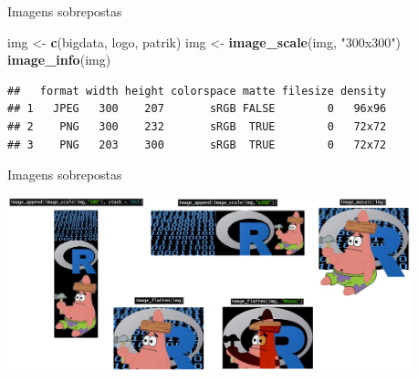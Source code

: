 \documentclass[
  ignorenonframetext,
]{beamer}
\newenvironment{Shaded}{\begin{snugshade}}{\end{snugshade}}
\newcommand{\KeywordTok}[1]{\textcolor[rgb]{0.13,0.29,0.53}{\textbf{#1}}}
\newcommand{\NormalTok}[1]{#1}
\newcommand{\StringTok}[1]{\textcolor[rgb]{0.31,0.60,0.02}{#1}}
\begin{document}
\begin{frame}[fragile]{Imagens sobrepostas}
\protect\hypertarget{imagens-sobrepostas}{}

\small

\begin{Shaded}
\begin{Highlighting}[]
\NormalTok{img <-}\StringTok{ }\KeywordTok{c}\NormalTok{(bigdata, logo, patrik)}
\NormalTok{img <-}\StringTok{ }\KeywordTok{image_scale}\NormalTok{(img, }\StringTok{"300x300"}\NormalTok{)}
\KeywordTok{image_info}\NormalTok{(img)}
\end{Highlighting}
\end{Shaded}

\begin{verbatim}
##   format width height colorspace matte filesize density
## 1   JPEG   300    207       sRGB FALSE        0   96x96
## 2    PNG   300    232       sRGB  TRUE        0   72x72
## 3    PNG   203    300       sRGB  TRUE        0   72x72
\end{verbatim}

\end{frame}

\begin{frame}{Imagens sobrepostas}
\protect\hypertarget{imagens-sobrepostas-1}{}

\small

\includegraphics[width=4.6in]{IMAGENS/juntar_sobrepor}

\begin{center}
\tiny{}
\end{center}

\end{frame}
\end{document}
